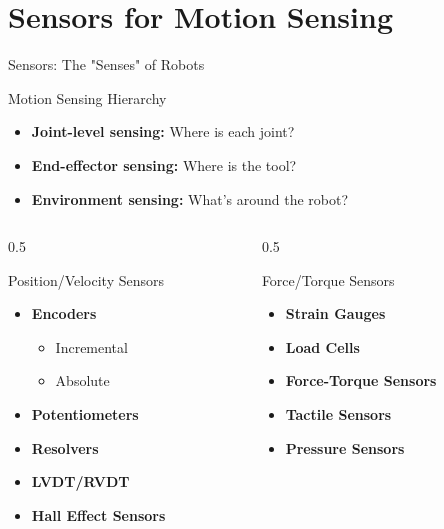 \documentclass[10pt]{beamer}
\begin{document}
\section{Sensors for Motion Sensing}
\begin{frame}{Sensors: The "Senses" of Robots}
	\begin{block}{Motion Sensing Hierarchy}
		\begin{itemize}
			\item \textbf{Joint-level sensing:} Where is each joint?
			\item \textbf{End-effector sensing:} Where is the tool?
			\item \textbf{Environment sensing:} What's around the robot?
		\end{itemize}
	\end{block}
	
	\begin{columns}
		\begin{column}{0.5\textwidth}
			\begin{exampleblock}{Position/Velocity Sensors}
				\begin{itemize}
					\item \textbf{Encoders}
					\begin{itemize}
						\footnotesize
						\item Incremental
						\item Absolute
					\end{itemize}
					\item \textbf{Potentiometers}
					\item \textbf{Resolvers}
					\item \textbf{LVDT/RVDT}
					\item \textbf{Hall Effect Sensors}
				\end{itemize}
			\end{exampleblock}
		\end{column}
		
		\begin{column}{0.5\textwidth}
			\begin{exampleblock}{Force/Torque Sensors}
				\begin{itemize}
					\item \textbf{Strain Gauges}
					\item \textbf{Load Cells}
					\item \textbf{Force-Torque Sensors}
					\item \textbf{Tactile Sensors}
					\item \textbf{Pressure Sensors}
				\end{itemize}
			\end{exampleblock}
		\end{column}
	\end{columns}
\end{frame}
\end{document}
